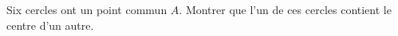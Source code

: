 Six cercles ont un point commun $A$. Montrer que l'un de ces cercles contient le centre d'un autre.
